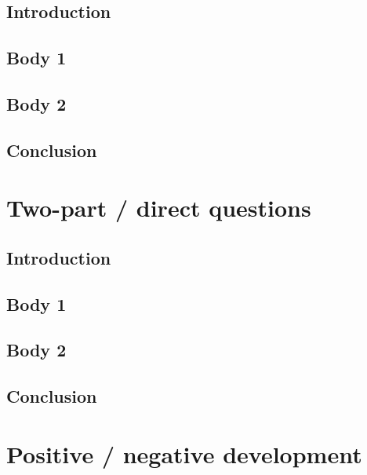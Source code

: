 \documentclass[11pt,a4paper]{article}
\begin{document}
\subsection*{Introduction}
\vspace{1cm}
\subsection*{Body 1}
\vspace{1cm}
\subsection*{Body 2}
\vspace{1cm}
\subsection*{Conclusion}
\vspace{1cm}
\clearpage
\section*{Two-part / direct questions}
\subsection*{Introduction}
\vspace{1cm}
\subsection*{Body 1}
\vspace{1cm}
\subsection*{Body 2}
\vspace{1cm}
\subsection*{Conclusion}
\vspace{1cm}
\clearpage
\section*{Positive / negative development}
\end{document}
